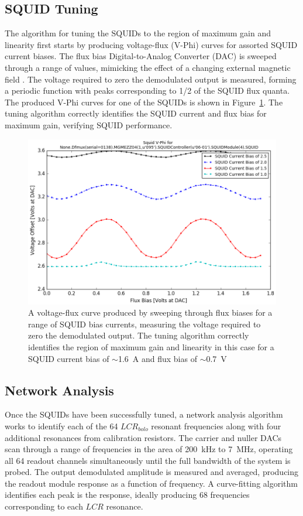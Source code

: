 \documentclass[iop]{emulateapj}
\begin{document}
\subsection{SQUID Tuning}

The algorithm for tuning the SQUIDs to the region of maximum gain and linearity first starts by producing voltage-flux (V-Phi) curves for assorted SQUID current biases.  The flux bias Digital-to-Analog Converter (DAC) is sweeped through a range of values, mimicking the effect of a changing external magnetic field \citep{bender_digital_2014}.  The voltage required to zero the demodulated output is measured, forming a periodic function with peaks corresponding to 1/2 of the SQUID flux quanta.  The produced V-Phi curves for one of the SQUIDs is shown in Figure~\ref{vphi}.  The tuning algorithm correctly identifies the SQUID current and flux bias for maximum gain, verifying SQUID performance.

\begin{figure}
	\includegraphics[width=\linewidth]{squid}
	\centering
	\caption{A voltage-flux curve produced by sweeping through flux biases for a range of SQUID bias currents, measuring the voltage required to zero the demodulated output.  The tuning algorithm correctly identifies the region of maximum gain and linearity in this case for a SQUID current bias of $\sim$1.6~A and flux bias of $\sim$0.7~V}
	\label{vphi}
\end{figure}

\subsection{Network Analysis}

Once the SQUIDs have been successfully tuned, a network analysis algorithm works to identify each of the 64 $LCR_{bolo}$ resonant frequencies along with four additional resonances from calibration resistors.  The carrier and nuller DACs scan through a range of frequencies in the area of 200~kHz to 7~MHz, operating all 64 readout channels simultaneously until the full bandwidth of the system is probed.  The output demodulated amplitude is measured and averaged, producing the readout module response as a function of frequency.  A curve-fitting algorithm identifies each peak is the response, ideally producing 68 frequencies corresponding to each $LCR$ resonance.  
\end{document}
